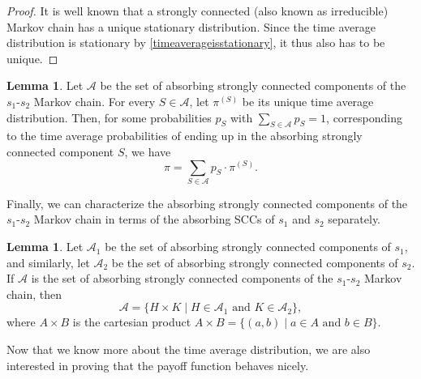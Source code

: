\documentclass[11pt]{amsart}
\theoremstyle{definition}
\newtheorem{lemma}[theorem]{Lemma}
\theoremstyle{remark}
\begin{document}
\begin{proof}
  It is well known that a strongly connected (also known as irreducible) Markov chain has a unique stationary distribution. Since the time average distribution is stationary by \cref{timeaverageisstationary}, it thus also has to be unique.
\end{proof}

\begin{lemma}
  \label{timeaveragedistributiondecomposition}
  Let $\mathcal{A}$ be the set of absorbing strongly connected components of the $s_1$-$s_2$ Markov chain. For every $S \in \mathcal{A}$, let $\pi^{(S)}$ be its unique time average distribution. Then, for some probabilities $p_{S}$ with $\sum_{S \in \mathcal{A}} p_{S} = 1$, corresponding to the time average probabilities of ending up in the absorbing strongly connected component $S$, we have \begin{equation*}
    \pi = \sum_{S \in \mathcal{A}} p_{S} \cdot \pi^{(S)}.
  \end{equation*}
\end{lemma}

Finally, we can characterize the absorbing strongly connected components of the $s_1$-$s_2$ Markov chain in terms of the absorbing SCCs of $s_1$ and $s_2$ separately.

\begin{lemma}
  \label{absorbingstronglyconnectedcomponentscartesianproduct}
  Let $\mathcal{A}_1$ be the set of absorbing strongly connected components of $s_1$, and similarly, let $\mathcal{A}_2$ be the set of absorbing strongly connected components of $s_2$. If $\mathcal{A}$ is the set of absorbing strongly connected components of the $s_1$-$s_2$ Markov chain, then 
  \begin{equation*}
    \mathcal{A} = \{H \times K \mid H \in \mathcal{A}_1 \text{ and } K \in \mathcal{A}_2\},
  \end{equation*}
  where $A \times B$ is the cartesian product $A \times B = \{(a, b) \mid a \in A \text{ and } b \in B\}$.
\end{lemma}

Now that we know more about the time average distribution, we are also interested in proving that the payoff function behaves nicely.
\end{document}
